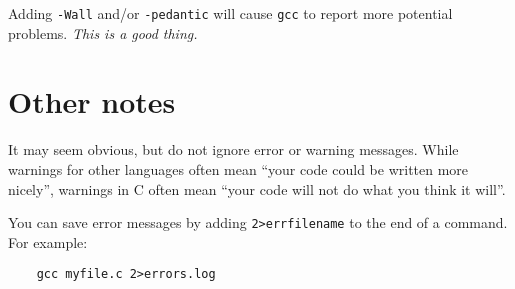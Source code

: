 Adding \texttt{-Wall} and/or \texttt{-pedantic} will cause \texttt{gcc} to report more potential problems.
\emph{This is a good thing.}

\section{Other notes}
It may seem obvious, but do not ignore error or warning messages.
While warnings for other languages often mean ``your code could be written more nicely'', warnings in C often mean ``your code will not do what you think it will''.

You can save error messages by adding \verb|2>errfilename| to the end of a command.
For example:
\begin{verbatim}
    gcc myfile.c 2>errors.log
\end{verbatim}




